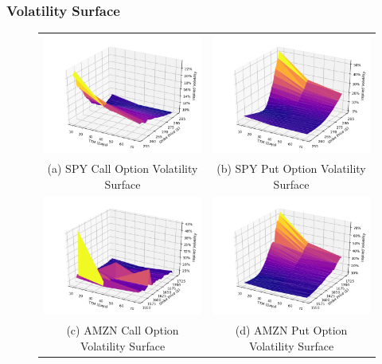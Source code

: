 \documentclass[10pt]{article}
\begin{document}
        \subsubsection{Volatility Surface}

        \begin{figure}
            \begin{tabular}{cc}
                \includegraphics[width=.475\textwidth]{bin/vol_surface/SPY_Call_3DVolSurface.png} &
                \includegraphics[width=.475\textwidth]{bin/vol_surface/SPY_Put_3DVolSurface.png} \\
                (a) SPY Call Option Volatility Surface &
                (b) SPY Put Option Volatility Surface \\
                \includegraphics[width=.475\textwidth]{bin/vol_surface/AMZN_Call_3DVolSurface.png} &
                \includegraphics[width=.475\textwidth]{bin/vol_surface/AMZN_Put_3DVolSurface.png} \\
                (c) AMZN Call Option Volatility Surface &
                (d) AMZN Put Option Volatility Surface
            \end{tabular}
        \end{figure}
\end{document}
